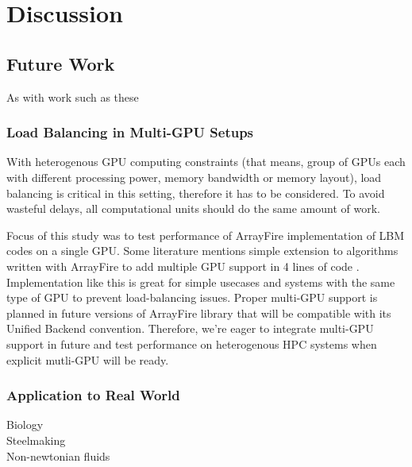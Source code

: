 \section{Discussion}\label{sec:discussion}

\subsection{Future Work}

As with work such as these

\subsubsection{Load Balancing in Multi-GPU Setups}
\label{sec:load-balancing}

With heterogenous GPU computing constraints (that means, group of GPUs each with different processing power, memory bandwidth or memory layout), load balancing is critical in this setting, therefore it has to be considered. To avoid wasteful delays, all computational units should do the same amount of work. 

Focus of this study was to test performance of ArrayFire implementation of LBM codes on a single GPU. Some literature mentions simple extension to algorithms written with ArrayFire to add multiple GPU support in 4 lines of code \cite{malcolmArrayFireGPUAcceleration2012a}. Implementation like this is great for simple usecases and systems with the same type of GPU to prevent load-balancing issues. Proper multi-GPU support is planned in future versions of ArrayFire library that will be compatible with its Unified Backend convention. Therefore, we're eager to integrate multi-GPU support in future and test performance on heterogenous HPC systems when explicit mutli-GPU will be ready.


\subsubsection{Application to Real World}

Biology \\
Steelmaking \\
Non-newtonian fluids \\



%

